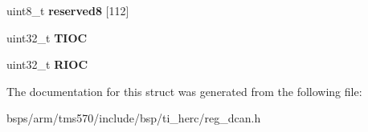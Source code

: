 \begin{DoxyCompactItemize}
\item 
\mbox{\label{structtms570__dcan__t_a130fe9c925eea65fe7eb08d18c7508ac}} 
uint8\+\_\+t {\bfseries reserved8} \mbox{[}112\mbox{]}
\item 
\mbox{\label{structtms570__dcan__t_a3d96b758d19c5b74724c8fb5b07e0fd8}} 
uint32\+\_\+t {\bfseries T\+I\+OC}
\item 
\mbox{\label{structtms570__dcan__t_aff9800c98b0536595f21b3e50447876b}} 
uint32\+\_\+t {\bfseries R\+I\+OC}
\end{DoxyCompactItemize}


The documentation for this struct was generated from the following file\+:\begin{DoxyCompactItemize}
\item 
bsps/arm/tms570/include/bsp/ti\+\_\+herc/reg\+\_\+dcan.\+h\end{DoxyCompactItemize}
